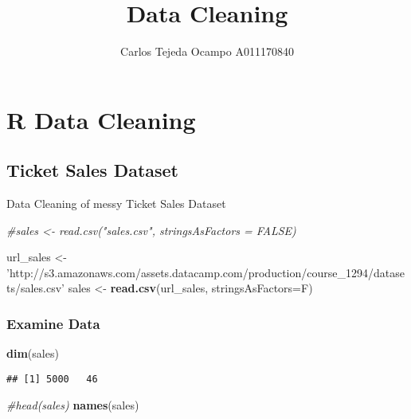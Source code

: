 \documentclass[]{article}
\title{Data Cleaning}
\author{Carlos Tejeda Ocampo A011170840}
\date{}
\newenvironment{Shaded}{\begin{snugshade}}{\end{snugshade}}
\newcommand{\CommentTok}[1]{\textcolor[rgb]{0.56,0.35,0.01}{\textit{#1}}}
\newcommand{\DataTypeTok}[1]{\textcolor[rgb]{0.13,0.29,0.53}{#1}}
\newcommand{\KeywordTok}[1]{\textcolor[rgb]{0.13,0.29,0.53}{\textbf{#1}}}
\newcommand{\NormalTok}[1]{#1}
\newcommand{\StringTok}[1]{\textcolor[rgb]{0.31,0.60,0.02}{#1}}
\begin{document}
\maketitle

\hypertarget{r-data-cleaning}{%
\section{R Data Cleaning}\label{r-data-cleaning}}

\hypertarget{ticket-sales-dataset}{%
\subsection{Ticket Sales Dataset}\label{ticket-sales-dataset}}

Data Cleaning of messy Ticket Sales Dataset

\begin{Shaded}
\begin{Highlighting}[]
\CommentTok{#sales <- read.csv("sales.csv", stringsAsFactors = FALSE)}

\NormalTok{url_sales <-}\StringTok{ 'http://s3.amazonaws.com/assets.datacamp.com/production/course_1294/datasets/sales.csv'}
\NormalTok{sales <-}\StringTok{ }\KeywordTok{read.csv}\NormalTok{(url_sales, }\DataTypeTok{stringsAsFactors=}\NormalTok{F)}
\end{Highlighting}
\end{Shaded}

\hypertarget{examine-data}{%
\subsubsection{Examine Data}\label{examine-data}}

\begin{Shaded}
\begin{Highlighting}[]
\KeywordTok{dim}\NormalTok{(sales)}
\end{Highlighting}
\end{Shaded}

\begin{verbatim}
## [1] 5000   46
\end{verbatim}

\begin{Shaded}
\begin{Highlighting}[]
\CommentTok{#head(sales)}
\KeywordTok{names}\NormalTok{(sales)}
\end{Highlighting}
\end{Shaded}
\end{document}
